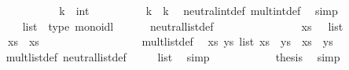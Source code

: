 \begin{isabellebody}
%
\isadelimproof
\ \ \ \ %
\endisadelimproof
%
\isatagproof
{}\isamarkupfalse%
\isanewline
\ \ \ \ \ \ \isamarkupfalse%
\ k\ {\isacharcolon}{\isacharcolon}\ int\isanewline
\ \ \ \ \ \ \isamarkupfalse%
\ {\isachardoublequoteopen}{\isasymone}\ {\isasymotimes}\ k\ {\isacharequal}\ k{\isachardoublequoteclose}\ \isamarkupfalse%
\ neutral{\isacharunderscore}int{\isacharunderscore}def\ mult{\isacharunderscore}int{\isacharunderscore}def\ \isamarkupfalse%
\ simp\isanewline
\ \ \ \ \isamarkupfalse%
%
\endisatagproof
{\isafoldproof}%
%
\isadelimproof
\isanewline
%
\endisadelimproof
\isanewline
\ \ \ \ \isamarkupfalse%
\ list\ {\isacharcolon}{\isacharcolon}\ {\isacharparenleft}type{\isacharparenright}\ monoidl\isanewline
\ \ \ \ \ \ neutral{\isacharunderscore}list{\isacharunderscore}def{\isacharcolon}\ {\isachardoublequoteopen}{\isasymone}\ {\isasymequiv}\ {\isacharbrackleft}{\isacharbrackright}{\isachardoublequoteclose}\isanewline
%
\isadelimproof
\ \ \ \ %
\endisadelimproof
%
\isatagproof
{}\isamarkupfalse%
\isanewline
\ \ \ \ \ \ \isamarkupfalse%
\ xs\ {\isacharcolon}{\isacharcolon}\ {\isachardoublequoteopen}{\isasymalpha}\ list{\isachardoublequoteclose}\isanewline
\ \ \ \ \ \ \isamarkupfalse%
\ {\isachardoublequoteopen}{\isasymone}\ {\isasymotimes}\ xs\ {\isacharequal}\ xs{\isachardoublequoteclose}\isanewline
\ \ \ \ \ \ \isamarkupfalse%
\ {\isacharminus}\isanewline
\ \ \ \ \ \ \ \ \isamarkupfalse%
\ mult{\isacharunderscore}list{\isacharunderscore}def\ \isamarkupfalse%
\ {\isachardoublequoteopen}{\isasymAnd}xs\ ys{\isasymColon}{\isasymalpha}\ list{\isachardot}\ xs\ {\isasymotimes}\ ys\ {\isasymequiv}\ xs\ {\isacharat}\ ys{\isachardoublequoteclose}\ \isacommand{{\isachardot}}\isamarkupfalse%
\isanewline
\ \ \ \ \ \ \ \ \isamarkupfalse%
\ \isamarkupfalse%
\ mult{\isacharunderscore}list{\isacharunderscore}def\ neutral{\isacharunderscore}list{\isacharunderscore}def\ \isamarkupfalse%
\ {\isachardoublequoteopen}{\isasymone}\ {\isasymequiv}\ {\isacharbrackleft}{\isacharbrackright}{\isasymColon}{\isasymalpha}\ list{\isachardoublequoteclose}\ \isamarkupfalse%
\ simp\isanewline
\ \ \ \ \ \ \ \ \isamarkupfalse%
\ \isamarkupfalse%
\ {\isacharquery}thesis\ \isamarkupfalse%
\ simp\isanewline
\ \ \ \ \ \ \isamarkupfalse%

\end{isabellebody}
